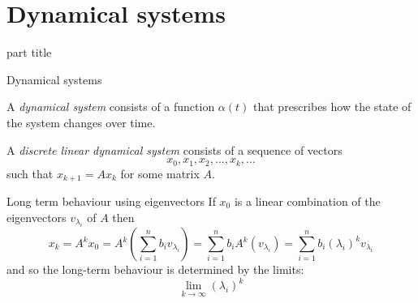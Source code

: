 \documentclass{beamer}
\begin{document}
\section{Dynamical systems}

\begin{frame}
\begin{beamercolorbox}[sep=12pt,center]{part title}
\insertsection\par
\end{beamercolorbox}
\end{frame}

\begin{frame}{Dynamical systems}
\begin{definition}
	A \emph{dynamical system} consists of a function $\alpha(t)$ that prescribes how the state of the system changes over time. 
\end{definition}
\begin{definition}
	A \emph{discrete linear dynamical system} consists of a sequence of vectors
	\begin{equation*}
	x_0, x_1, x_2, \dots, x_k, \dots
	\end{equation*}
	such that $x_{k+1} = Ax_{k}$ for some matrix $A$.
\end{definition}
\end{frame}

\begin{frame}{Long term behaviour using eigenvectors}
If $x_0$ is a linear combination of the eigenvectors $v_{\lambda_i}$ of $A$ then 
\begin{equation*}
x_k = A^k x_0 = A^k\left(\sum_{i=1}^n b_i v_{\lambda_i}\right) = \sum_{i=1}^n b_i A^k\left(v_{\lambda_i}\right) = \sum_{i=1}^nb_i(\lambda_i)^kv_{\lambda_i}
\end{equation*}
and so the long-term behaviour is determined by the limits:
\begin{equation*}
\lim_{k\to \infty} (\lambda_i)^k
\end{equation*}
\end{frame}
\end{document}

